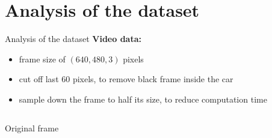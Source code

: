 \section{Analysis of the dataset}

\begin{frame}{Analysis of the dataset}
	\textbf{Video data:}
	\begin{itemize}
		\item<+-> frame size of $(640,480,3)$ pixels
		\item<+-> cut off last 60 pixels, to remove black frame inside the car
		\item<+-> sample down the frame to half its size, to reduce computation time
	\end{itemize}
	
	\begin{columns}[t]
		\begin{column}{.45\textwidth}
			\begin{center}
				\small{Original frame}
			\end{center}
		\end{column}
		\begin{column}{.45\textwidth}
			\begin{center}

\end{center}
\end{column}
\end{columns}
\end{frame}
